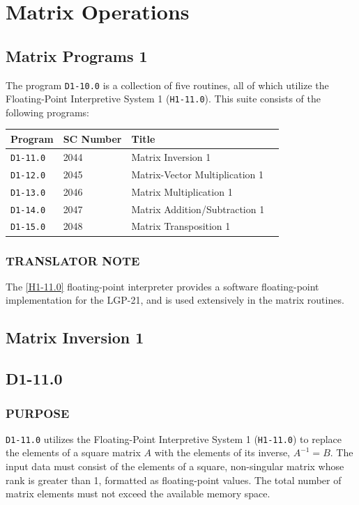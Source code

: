 \documentclass{article}
\begin{document}
\section{Matrix Operations}
\label{sec:matrix_operations}

\subsection{Matrix Programs 1}
\label{subsec:matrix_programs_1}

The program \texttt{D1-10.0} is a collection of five routines, all of which utilize the Floating-Point Interpretive System 1 (\texttt{H1-11.0}). This suite consists of the following programs:

\medskip
\noindent
\begin{tabular}{llll}
\toprule
\textbf{Program} & \textbf{SC Number} & \textbf{Title} \\
\midrule
\texttt{D1-11.0} & 2044               & Matrix Inversion 1 \\
\texttt{D1-12.0} & 2045               & Matrix-Vector Multiplication 1 \\
\texttt{D1-13.0} & 2046               & Matrix Multiplication 1 \\
\texttt{D1-14.0} & 2047               & Matrix Addition/Subtraction 1 \\
\texttt{D1-15.0} & 2048               & Matrix Transposition 1 \\
\bottomrule
\end{tabular}

\subsubsection*{TRANSLATOR NOTE}
The \ref{H1-11.0} floating-point interpreter provides a software floating-point implementation for the LGP-21, and is used extensively in the matrix routines.

\newpage

\subsection{Matrix Inversion 1}
\label{subsec:matrix_inversion_1}

\subsection*{D1-11.0}

\subsubsection*{PURPOSE}
\texttt{D1-11.0} utilizes the Floating-Point Interpretive System 1 (\texttt{H1-11.0}) to replace the elements of a square matrix $A$ with the elements of its inverse, $A^{-1} = B$. The input data must consist of the elements of a square, non-singular matrix whose rank is greater than 1, formatted as floating-point values. The total number of matrix elements must not exceed the available memory space.
\end{document}
